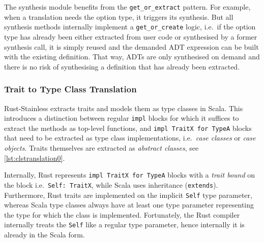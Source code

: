 The synthesis module benefits from the \lstinline!get_or_extract! pattern. For
example, when a translation needs the option type, it triggers its synthesis.
But all synthesis methods internally implement a \lstinline!get_or_create!
logic, i.e.~if the option type has already been either extracted from user code
or synthesised by a former synthesis call, it is simply reused and the demanded
ADT expression can be built with the existing definition. That way, ADTs are
only synthesised on demand and there is no risk of synthesising a definition
that has already been extracted.

\subsubsection{Trait to Type Class Translation}
\label{type-class-extraction}

Rust-Stainless extracts traits and models them as type classes in Scala. This
introduces a distinction between regular \lstinline!impl! blocks for which it
suffices to extract the methods as top-level functions, and
\passthrough{\lstinline!impl TraitX for TypeA!} blocks that need to be extracted
as type class implementations, i.e.~\emph{case classes} or \emph{case objects}.
Traits themselves are extracted as \emph{abstract classes}, see
\autoref{lst:clstranslation0}.

Internally, Rust represents \passthrough{\lstinline!impl TraitX for TypeA!}
blocks with a \emph{trait bound} on the block i.e.~\passthrough{\lstinline!Self:
TraitX!}, while Scala uses inheritance (\passthrough{\lstinline!extends!}).
Furthermore, Rust traits are implemented on the implicit \lstinline!Self! type
parameter, whereas Scala type classes always have at least one type parameter
representing the type for which the class is implemented. Fortunately, the Rust
compiler internally treats the \lstinline!Self! like a regular type parameter,
hence internally it is already in the Scala form.

